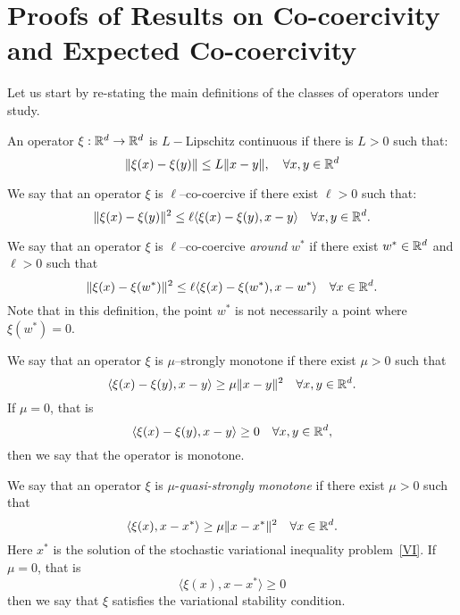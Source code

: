 \documentclass{article}
\begin{document}
\tableofcontents

\section{Proofs of Results on Co-coercivity and Expected Co-coercivity}
\label{AppendixEC}

Let us start by re-stating the main definitions of the classes of operators under study.
\begin{definition}
An operator $\xi: \mathbb{R}^d \rightarrow \mathbb{R}^d$ is $L-$Lipschitz continuous if there is $L>0$ such that:
\begin{equation}
\label{DefLipschitz}
\|\xi(x)-\xi(y)\| \leq L \|x-y\|, \quad \forall x, y \in \mathbb{R}^d
\end{equation}
\end{definition}

\begin{definition}[Co-coercivity]
\label{DefCOCO}
We say that an operator $\xi$ is $\ell$--co-coercive if there exist $\ell>0$ such that:
$$\|\xi(x)-\xi(y)\|^2 \leq \ell \langle\xi(x)-\xi(y),x-y\rangle \quad \forall x , y \in \mathbb{R}^d.$$
\end{definition}

\begin{definition}
\label{DefCOCOStar}
We say that an operator $\xi$ is $\ell$--co-coercive \emph{around} $w^*$ if there exist $w^* \in \mathbb{R}^d$ and $\ell>0$ such that $$\|\xi(x)-\xi(w^*)\|^2 \leq \ell \langle\xi(x)-\xi(w^*),x-w^*\rangle \quad \forall x \in \mathbb{R}^d.$$Note that in this definition, the point $w^*$ is not necessarily a point where $\xi(w^*)=0$.
\end{definition}


\begin{definition}
\label{DefSM}
We say that an operator $\xi$ is $\mu$--strongly monotone if there exist $\mu>0$ such that $$\left\langle\xi(x)-\xi(y),  x-y\right\rangle \geq \mu \|x-y\|^2 \quad \forall x,y \in \mathbb{R}^d.$$ 
If $\mu=0$, that is $$\left\langle\xi(x)-\xi(y),  x-y\right\rangle \geq 0 \quad \forall x,y \in \mathbb{R}^d,$$ then we say that the operator is monotone.
\end{definition}

\begin{definition}
\label{DefQSM}
We say that an operator $\xi$ is $\mu$-\emph{quasi-strongly monotone} if there exist $\mu>0$ such that $$\left\langle\xi(x),  x-x^*\right\rangle \geq \mu \|x-x^*\|^2 \quad \forall x \in \mathbb{R}^d.$$ 
Here $x^*$ is the solution of the stochastic variational inequality problem~\eqref{VI}.
If $\mu=0$, that is 
\begin{equation}
\label{DefVarStab}
\langle \xi(x), x-x^*\rangle\geq 0
\end{equation}
then we say that $\xi$ satisfies the variational stability condition.
\end{definition}
\end{document}
